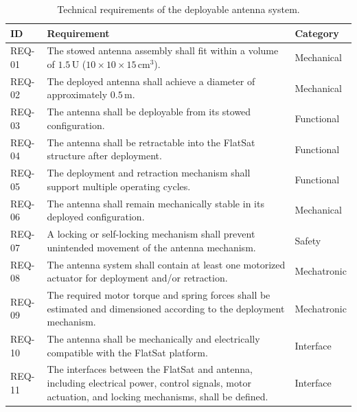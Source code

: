 \begin{table}[H]
	\centering
	\small
	\caption{Technical requirements of the deployable antenna system.}
	\label{tab:technical_requirements}
	\begin{tabularx}{\textwidth}{|l|X|l|}
		\hline
		\textbf{ID} & \textbf{Requirement} & \textbf{Category} \\
		\hline
		
		REQ-01 &
		The stowed antenna assembly shall fit within a volume of
		$1.5\,\mathrm{U}$ ($10 \times 10 \times 15\,\mathrm{cm^3}$). &
		Mechanical \\
		\hline
		
		REQ-02 &
		The deployed antenna shall achieve a diameter of approximately
		$0.5\,\mathrm{m}$. &
		Mechanical \\
		\hline
		
		REQ-03 &
		The antenna shall be deployable from its stowed configuration. &
		Functional \\
		\hline
		
		REQ-04 &
		The antenna shall be retractable into the FlatSat structure after
		deployment. &
		Functional \\
		\hline
		
		REQ-05 &
		The deployment and retraction mechanism shall support multiple
		operating cycles. &
		Functional \\
		\hline
		
		REQ-06 &
		The antenna shall remain mechanically stable in its deployed
		configuration. &
		Mechanical \\
		\hline
		
		REQ-07 &
		A locking or self-locking mechanism shall prevent unintended
		movement of the antenna mechanism. &
		Safety \\
		\hline
		
		REQ-08 &
		The antenna system shall contain at least one motorized actuator
		for deployment and/or retraction. &
		Mechatronic \\
		\hline
		
		REQ-09 &
		The required motor torque and spring forces shall be estimated and
		dimensioned according to the deployment mechanism. &
		Mechatronic \\
		\hline
		
		REQ-10 &
		The antenna shall be mechanically and electrically compatible with
		the FlatSat platform. &
		Interface \\
		\hline
		
		REQ-11 &
		The interfaces between the FlatSat and antenna, including electrical
		power, control signals, motor actuation, and locking mechanisms,
		shall be defined. &
		Interface \\
		\hline
		

\end{tabularx}
\end{table}
